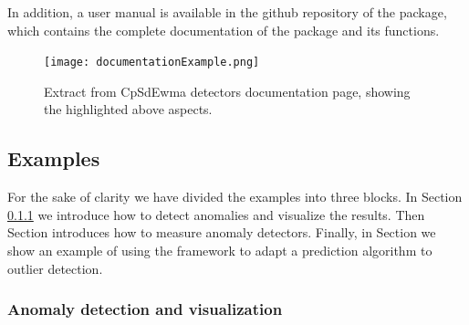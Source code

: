 \documentclass[a4paper]{article}\usepackage[]{graphicx}\usepackage[]{color}
\begin{document}
In addition, a user manual is available in the github repository of the   package, which contains the complete documentation of the package and its functions.

\begin{figure}[htbp]
\centering
\texttt{[image: documentationExample.png]}
\caption{Extract from CpSdEwma detectors documentation page, showing the highlighted above aspects.}
\label{fig:documentation}
\end{figure}

\newpage

\subsection{Examples}\label{sec:examples}

For the sake of clarity we have divided the examples into three blocks. In Section \ref{sec:examples-bloq1} we introduce how to detect anomalies and visualize the results. Then Section \label{sec:examples-bloq2} introduces how to measure anomaly detectors. Finally, in Section \label{sec:examples-bloq3} we show an example of using the framework to adapt a prediction algorithm to outlier detection.

\subsubsection{Anomaly detection and visualization}\label{sec:examples-bloq1}
\end{document}
